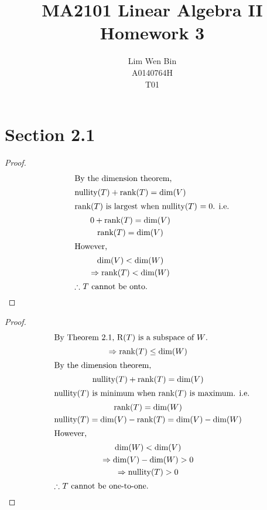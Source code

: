 \documentclass[12pt]{article}
\newenvironment{problem}[2][Problem]{\begin{trivlist}
\item[\hskip \labelsep {\bfseries #1}\hskip \labelsep {\bfseries #2.}]}{\end{trivlist}}
\begin{document}
\title{MA2101 Linear Algebra II Homework 3}
\author{Lim Wen Bin \\
A0140764H\\
T01}
\maketitle

\section*{Section 2.1}

\begin{problem}{17.a}
\end{problem}
\begin{proof}
\begin{gather*}
	\intertext{By the dimension theorem,}
	\text{nullity}(T) + \text{rank}(T) = \text{dim}(V) \\
	\intertext{rank($T$) is largest when nullity($T$) $= 0$. i.e.}
	0 + \text{rank}(T) = \text{dim}(V) \\
	\text{rank}(T) = \text{dim}(V) \\
	\shortintertext{However,}
	\text{dim}(V) < \text{dim}(W) \\
	\Rightarrow \text{rank}(T) < \text{dim}(W) \\
	\intertext{$\therefore$ $T$ cannot be onto.}
\end{gather*}
\end{proof}
\filbreak

\begin{problem}{17.b}
\end{problem}
\begin{proof}
\begin{gather*}
	\intertext{By Theorem 2.1, R($T$) is a subspace of $W$.}
	\Rightarrow \text{rank}(T) \le \text{dim}(W) \\
	\intertext{By the dimension theorem,}
	\text{nullity}(T) + \text{rank}(T) = \text{dim}(V) \\
	\intertext{nullity($T$) is minimum when rank($T$) is maximum. i.e.}
	\text{rank}(T) = \text{dim}(W) \\
	\text{nullity}(T) = \text{dim}(V) - \text{rank}(T) = \text{dim}(V) - \text{dim}(W) \\
	\shortintertext{However,}
	\text{dim}(W) < \text{dim}(V) \\
	\Rightarrow \text{dim}(V) - \text{dim}(W) > 0\\	
	\Rightarrow \text{nullity}(T) > 0\\	
	\intertext{$\therefore$ $T$ cannot be one-to-one.}
\end{gather*}
\end{proof}
\filbreak
\end{document}
